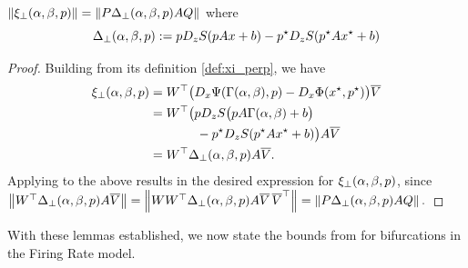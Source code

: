 \documentclass[letterpaper, 10 pt, conference]{ieeeconf}
\begin{document}
\vspace{3mm}

\begin{lemma}\label{lem:firing-xi_perp}
    \(\left\lVert{\ensuremath{\xi_{\perp}(\alpha,\beta,p)}}\right\rVert = \left\lVert{P \Delta_{\perp}(\alpha,\beta,p) A Q}\right\rVert\) where
    \vspace{0mm} \begin{equation}
        \Delta_{\perp}(\alpha,\beta,p) := pD_{z}S(pAx + b) - p^{\star}D_{z}S(p^{\star}Ax^{\star} + b) \label{eq:firing-delta_perp}
        \vspace{2mm} \end{equation}
\end{lemma}
\begin{proof}
    Building from its definition \eqref{def:xi_perp}, we have
    \begin{align*}
        \xipp{p} & = W^{\top}\big(D_{x}\Psi(\Gamma(\alpha,\beta),p)-D_{x}\Phi(x^{\star},p^{\star})\big)\Vbar \\
                 & = W^{\top}\bigl(pD_{z}S\bigl(pA\Gamma(\alpha,\beta) + b\bigr) \notag                      \\
                 & \hspace{13mm} - p^{\star}D_{z}S(p^{\star}Ax^{\star} + b)\bigr)A\Vbar                      \\
                 & = W^{\top} \Delta_{\perp}(\alpha, \beta, p) A \Vbar.
    \end{align*}
    Applying  to the above results in the desired expression for \(\xi_{\perp}(\alpha,\beta,p)\), since
    \(
    \left\lVert{W^{\top} \Delta_{\perp}(\alpha, \beta, p) A \ensuremath{\overline{V}}}\right\rVert = \left\lVert{WW^{\top} \Delta_{\perp}(\alpha, \beta, p) A \ensuremath{\overline{V}}\,\ensuremath{\overline{V}}^{\top}}\right\rVert = \left\lVert{P \Delta_{\perp}(\alpha, \beta, p) A Q}\right\rVert.
    \)
\end{proof}

\vspace{3mm}

With these lemmas established, we now state the bounds from  for bifurcations in the Firing Rate model.

\vspace{3mm}
\end{document}
